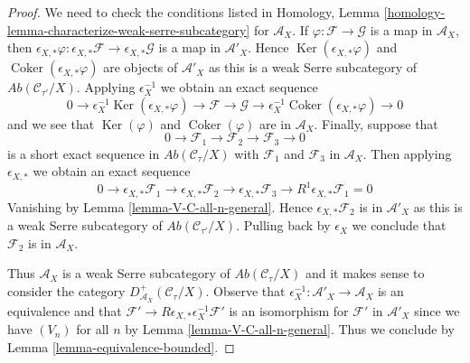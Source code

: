 \documentclass[10pt,a4paper]{amsart}
\theoremstyle{plain}
\theoremstyle{definition}
\theoremstyle{remark}
\numberwithin{equation}{subsection}
\def\Ker{\mathop{\mathrm{Ker}}}
\def\Coker{\mathop{\mathrm{Coker}}}
\begin{document}
\begin{proof}
We need to check the conditions listed in
Homology, Lemma \ref{homology-lemma-characterize-weak-serre-subcategory}
for $\mathcal{A}_X$. If $\varphi : \mathcal{F} \to \mathcal{G}$ is a map
in $\mathcal{A}_X$, then $\epsilon_{X, *}\varphi :
\epsilon_{X, *}\mathcal{F} \to \epsilon_{X, *}\mathcal{G}$
is a map in $\mathcal{A}'_X$. Hence $\Ker(\epsilon_{X, *}\varphi)$ and
$\Coker(\epsilon_{X, *}\varphi)$ are objects of $\mathcal{A}'_X$
as this is a weak Serre subcategory of $\textit{Ab}(\mathcal{C}_{\tau'}/X)$.
Applying $\epsilon_X^{-1}$ we obtain an exact sequence
$$
0 \to
\epsilon_X^{-1}\Ker(\epsilon_{X, *}\varphi) \to
\mathcal{F} \to \mathcal{G} \to
\epsilon_X^{-1}\Coker(\epsilon_{X, *}\varphi) \to 0
$$
and we see that $\Ker(\varphi)$ and $\Coker(\varphi)$ are in
$\mathcal{A}_X$. Finally, suppose that
$$
0 \to \mathcal{F}_1 \to \mathcal{F}_2 \to \mathcal{F}_3 \to 0
$$
is a short exact sequence in $\textit{Ab}(\mathcal{C}_\tau/X)$
with $\mathcal{F}_1$ and $\mathcal{F}_3$ in $\mathcal{A}_X$.
Then applying $\epsilon_{X, *}$ we obtain an exact sequence
$$
0 \to 
\epsilon_{X, *}\mathcal{F}_1 \to
\epsilon_{X, *}\mathcal{F}_2 \to
\epsilon_{X, *}\mathcal{F}_3 \to
R^1\epsilon_{X, *}\mathcal{F}_1 = 0
$$
Vanishing by Lemma \ref{lemma-V-C-all-n-general}.
Hence $\epsilon_{X, *}\mathcal{F}_2$ is in $\mathcal{A}'_X$
as this is a weak Serre subcategory of $\textit{Ab}(\mathcal{C}_{\tau'}/X)$.
Pulling back by $\epsilon_X$ we conclude that
$\mathcal{F}_2$ is in $\mathcal{A}_X$.

\medskip\noindent
Thus $\mathcal{A}_X$ is a weak Serre subcategory of
$\textit{Ab}(\mathcal{C}_\tau/X)$ and it makes sense
to consider the category $D^+_{\mathcal{A}_X}(\mathcal{C}_\tau/X)$.
Observe that $\epsilon_X^{-1} : \mathcal{A}'_X \to \mathcal{A}_X$
is an equivalence and that
$\mathcal{F}' \to R\epsilon_{X, *}\epsilon_X^{-1}\mathcal{F}'$
is an isomorphism for $\mathcal{F}'$ in $\mathcal{A}'_X$ since we
have $(V_n)$ for all $n$ by Lemma \ref{lemma-V-C-all-n-general}.
Thus we conclude by Lemma \ref{lemma-equivalence-bounded}.
\end{proof}
\end{document}
